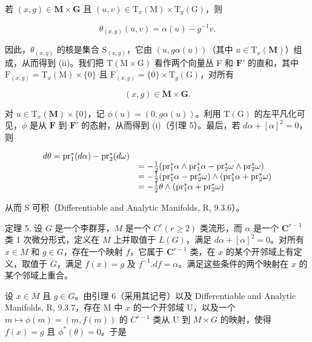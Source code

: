 若 \((x,g)\in \mathbf{M}\times \mathbf{G}\) 且 \((u,v)\in \mathrm{T}_x(\mathrm{M})\times \mathrm{T}_g(\mathrm{G})\)，则

\[
\theta_ {(x, g)} (u, v) = \alpha (u) - g ^ {- 1} v.
\]

因此，\(\theta_{(x,g)}\) 的核是集合 \(\mathrm{S}_{(x,g)}\)，它由 \((u,g\alpha (u))\)（其中 \(u\in \mathrm{T}_x(\mathbf{M})\)）组成，从而得到 (ii)。我们把 \(\mathrm{T}(\mathrm{M}\times \mathrm{G})\) 看作两个向量丛 F 和 \(\mathbf{F}'\) 的直和，其中 \(\mathrm{F}_{(x,g)} = \mathrm{T}_x(\mathrm{M})\times \{0\}\) 且 \(\mathrm{F}_{(x,g)}^{\prime} = \{0\} \times \mathrm{T}_g(\mathrm{G})\)，对所有

\[
(x, g) \in \mathbf {M} \times \mathbf {G}.
\]

对 \(u \in \mathrm{T}_{x}(\mathbf{M}) \times \{0\}\)，记 \(\phi(u) = (0, g\alpha(u))\)。利用 \(\mathrm{T}(\mathrm{G})\) 的左平凡化可见，\(\phi\) 是从 \(\mathbf{F}\) 到 \(\mathbf{F}'\) 的态射，从而得到 (i)（引理 5）。最后，若 \(d\alpha + [\alpha]^2 = 0\)，则

\[
\begin{array}{r l} {d \theta = \mathrm{pr} _ {1} ^ {*} (d \alpha) - \mathrm{pr} _ {2} ^ {*} (d \omega)} \\ & {= - \frac {1}{2} (\mathrm{pr} _ {1} ^ {*} \alpha \wedge \mathrm{pr} _ {1} ^ {*} \alpha - \mathrm{pr} _ {2} ^ {*} \omega \wedge \mathrm{pr} _ {2} ^ {*} \omega)} \\ & {= - \frac {1}{2} (\mathrm{pr} _ {1} ^ {*} \alpha - \mathrm{pr} _ {2} ^ {*} \omega) \wedge (\mathrm{pr} _ {1} ^ {*} \alpha + \mathrm{pr} _ {2} ^ {*} \omega)} \\ & {= - \frac {1}{2} \theta \wedge (\mathrm{pr} _ {1} ^ {*} \alpha + \mathrm{pr} _ {2} ^ {*} \omega)} \end{array}
\]

从而 S 可积（Differentiable and Analytic Manifolds, R, 9.3.6）。

定理 5. 设 \(G\) 是一个李群芽，\(M\) 是一个 \(C^r (r\geqslant 2)\) 类流形，而 \(\alpha\) 是一个 \(\mathbf{C}^{r-1}\) 类 1 次微分形式，定义在 \(M\) 上并取值于 \(L(G)\)，满足 \(d\alpha +[\alpha ]^2 = 0\)。对所有 \(x\in M\) 和 \(g\in G\)，存在一个映射 \(f\)，它属于 \(\mathbf{C}^{r-1}\) 类，在 \(x\) 的某个开邻域上有定义，取值于 \(G\)，满足 \(f(x) = g\) 及 \(f^{-1}.df = \alpha\)。满足这些条件的两个映射在 \(x\) 的某个邻域上重合。

设 \(x \in M\) 且 \(g \in G\)。由引理 6（采用其记号）以及 Differentiable and Analytic Manifolds, R, 9.3.7，存在 M 中 \(x\) 的一个开邻域 U，以及一个 \(m \mapsto \phi(m) = (m, f(m))\) 的 \(C^{r-1}\) 类从 U 到 \(M \times G\) 的映射，使得 \(f(x) = g\) 且 \(\phi^*(\theta) = 0\)。于是


